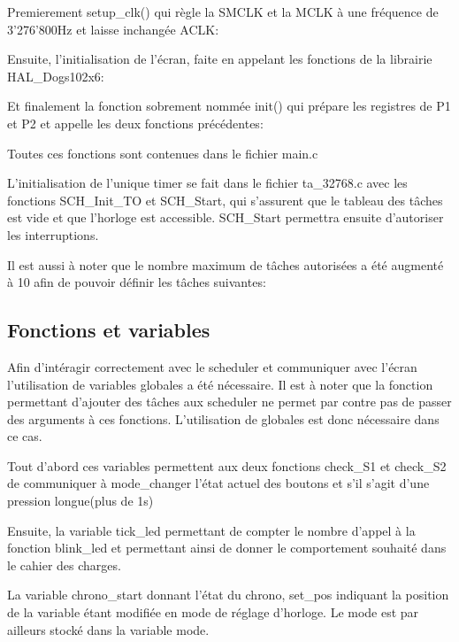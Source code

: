 Premierement setup\_clk() qui règle la SMCLK et la MCLK à une fréquence de 3'276'800Hz et laisse inchangée ACLK:


Ensuite, l'initialisation de l'écran, faite en appelant les fonctions de la librairie HAL\_Dogs102x6:


Et finalement la fonction sobrement nommée init() qui prépare les registres de P1 et P2 et appelle les deux fonctions précédentes:


Toutes ces fonctions sont contenues dans le fichier main.c

L'initialisation de l'unique timer se fait dans le fichier ta\_32768.c avec les fonctions SCH\_Init\_TO et SCH\_Start, qui s'assurent que le tableau des tâches est vide et que l'horloge est accessible. SCH\_Start permettra ensuite d'autoriser les interruptions.



Il est aussi à noter que le nombre maximum de tâches autorisées a été augmenté à 10 afin de pouvoir définir les tâches suivantes:



\subsection{Fonctions et variables}
Afin d'intéragir correctement avec le scheduler et communiquer avec l'écran l'utilisation de variables globales a été nécessaire. Il est à noter que la fonction permettant d'ajouter des tâches aux scheduler ne permet par contre pas de passer des arguments à ces fonctions. L'utilisation de globales est donc nécessaire dans ce cas.



Tout d'abord ces variables permettent aux deux fonctions check\_S1 et check\_S2 de communiquer à mode\_changer l'état actuel des boutons et s'il s'agit d'une pression longue(plus de 1s)



Ensuite, la variable tick\_led permettant de compter le nombre d'appel à la fonction blink\_led et permettant ainsi de donner le comportement souhaité dans le cahier des charges.



La variable chrono\_start donnant l'état du chrono, set\_pos indiquant la position de la variable étant modifiée en mode de réglage d'horloge.
Le mode est par ailleurs stocké dans la variable mode.

